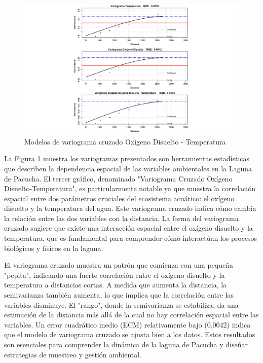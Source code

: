 \begin{figure}[!htb]
    \centering
    \includegraphics[width=1\linewidth]{Figuras_AED/ESTIMACION/cross_vario_pd_tem.pdf}
    \caption{Modelos de variograma cruzado Oxigeno Disuelto -  Temperatura}
    \label{fig:enter-labelCRER}
\end{figure}

 La Figura \ref{fig:enter-labelCRER} muestra los variogramas presentados son herramientas estadísticas que describen la dependencia espacial de las variables ambientales en la Laguna de Pacucha. El tercer gráfico, denominado "Variograma Cruzado Oxígeno Disuelto-Temperatura", es particularmente notable ya que muestra la correlación espacial entre dos parámetros cruciales del ecosistema acuático: el oxígeno disuelto y la temperatura del agua. Este variograma cruzado indica cómo cambia la relación entre las dos variables con la distancia. La forma del variograma cruzado sugiere que existe una interacción espacial entre el oxígeno disuelto y la temperatura, que es fundamental para comprender cómo interactúan los procesos biológicos y físicos en la laguna.

El variograma cruzado muestra un patrón que comienza con una pequeña "pepita", indicando una fuerte correlación entre el oxígeno disuelto y la temperatura a distancias cortas. A medida que aumenta la distancia, la semivarianza también aumenta, lo que implica que la correlación entre las variables disminuye. El "rango", donde la semivarianza se estabiliza, da una estimación de la distancia más allá de la cual no hay correlación espacial entre las variables. Un error cuadrático medio (ECM) relativamente bajo (0,0042) indica que el modelo de variograma cruzado se ajusta bien a los datos. Estos resultados son esenciales para comprender la dinámica de la laguna de Pacucha y diseñar estrategias de muestreo y gestión ambiental.

